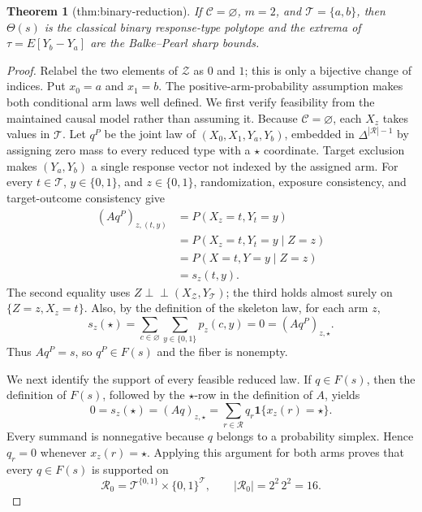 \documentclass{article}
\newtheorem{theorem}{Theorem}
\begin{document}
\begin{theorem}[thm:binary-reduction]\label{thm:binary-reduction}
If \(\mathcal C=\varnothing\), \(m=2\), and \(\mathcal T=\{a,b\}\), then \(\Theta(s)\) is the classical binary response-type polytope and the extrema of \(\tau=E[Y_b-Y_a]\) are the Balke--Pearl sharp bounds.
\end{theorem}
\begin{proof}
Relabel the two elements of \(\mathcal Z\) as \(0\) and \(1\); this is only a bijective change of indices. Put \(x_0=a\) and \(x_1=b\). The positive-arm-probability assumption makes both conditional arm laws well defined. We first verify feasibility from the maintained causal model rather than assuming it. Because \(\mathcal C=\varnothing\), each \(X_z\) takes values in \(\mathcal T\). Let \(q^P\) be the joint law of \((X_0,X_1,Y_a,Y_b)\), embedded in \(\Delta^{|\mathcal R|-1}\) by assigning zero mass to every reduced type with a \(\star\) coordinate. Target exclusion makes \((Y_a,Y_b)\) a single response vector not indexed by the assigned arm. For every \(t\in\mathcal T\), \(y\in\{0,1\}\), and \(z\in\{0,1\}\), randomization, exposure consistency, and target-outcome consistency give
\[
\begin{aligned}
(Aq^P)_{z,(t,y)}
&=P(X_z=t,Y_t=y)\\
&=P(X_z=t,Y_t=y\mid Z=z)\\
&=P(X=t,Y=y\mid Z=z)\\
&=s_z(t,y).
\end{aligned}
\]
The second equality uses \(Z\perp\!\!\!\perp(X_{\mathcal Z},Y_{\mathcal T})\); the third holds almost surely on \(\{Z=z,X_z=t\}\). Also, by the definition of the skeleton law, for each arm \(z\),
\[
s_z(\star)=\sum_{c\in\varnothing}\sum_{y\in\{0,1\}}p_z(c,y)=0=(Aq^P)_{z,\star}.
\]
Thus \(Aq^P=s\), so \(q^P\in F(s)\) and the fiber is nonempty.

We next identify the support of every feasible reduced law. 
If \(q\in F(s)\), then the definition of \(F(s)\), followed by the \(\star\)-row in the definition of \(A\), yields
\[
0=s_z(\star)=(Aq)_{z,\star}
 =\sum_{r\in\mathcal R}q_r\mathbf 1\{x_z(r)=\star\}.
\]
Every summand is nonnegative because \(q\) belongs to a probability simplex. Hence \(q_r=0\) whenever \(x_z(r)=\star\). Applying this argument for both arms proves that every \(q\in F(s)\) is supported on
\[
\mathcal R_0=\mathcal T^{\{0,1\}}\times\{0,1\}^{\mathcal T},
\qquad |\mathcal R_0|=2^2\,2^2=16.
\]


\end{proof}
\end{document}
